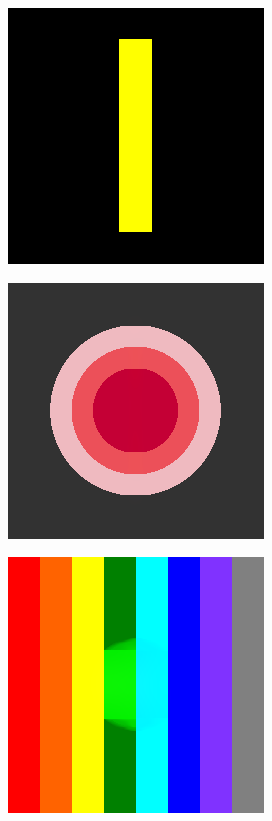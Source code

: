 \begin{figure}[H]
	\centering
	\begin{subfigure}{\ResultSubFigureWidth \linewidth}
		\centering
		\includegraphics[width=\ResultSubFigurePadding \linewidth]{image/result_ex1/splitbergman01.png}
	\end{subfigure}
	\begin{subfigure}{\ResultSubFigureWidth \linewidth}
		\centering
		\includegraphics[width=\ResultSubFigurePadding \linewidth]{image/result_ex1/splitbergman02.png}
	\end{subfigure}
	\begin{subfigure}{\ResultSubFigureWidth \linewidth}
		\centering
		\includegraphics[width=\ResultSubFigurePadding \linewidth]{image/result_ex1/splitbergman03.png}			

\end{subfigure}
\end{figure}
